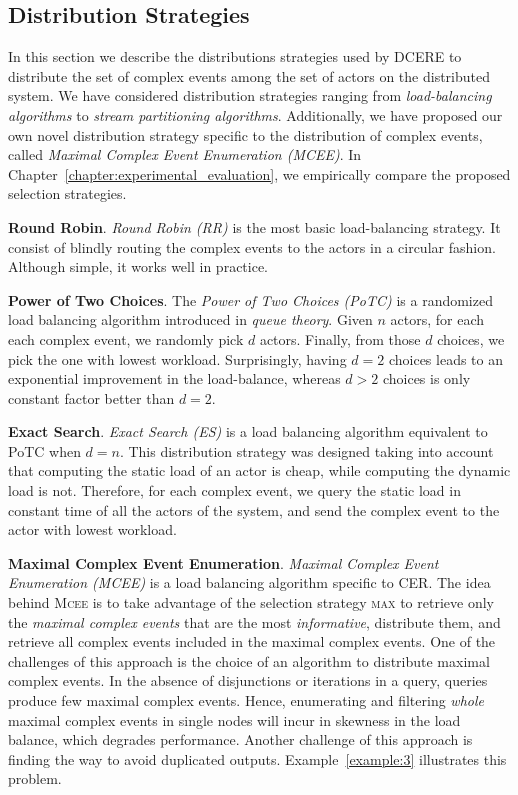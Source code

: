 \subsection{Distribution Strategies}\label{subsec:dcere:distribution-strategies}

In this section we describe the distributions strategies used by DCERE to distribute the set of complex events among the set of actors on the distributed system. We have considered distribution strategies ranging from \emph{load-balancing algorithms} to \emph{stream partitioning algorithms}. Additionally, we have proposed our own novel distribution strategy specific to the distribution of complex events, called \emph{Maximal Complex Event Enumeration (MCEE)}. In Chapter~\ref{chapter:experimental_evaluation}, we empirically compare the proposed selection strategies.

\textbf{Round Robin}. \emph{Round Robin (RR)} is the most basic load-balancing strategy. It consist of blindly routing the complex events to the actors in a circular fashion. Although simple, it works well in practice.

\textbf{Power of Two Choices}. The \emph{Power of Two Choices (PoTC)} \cite{load-balancing-1} is a randomized load balancing algorithm introduced in \emph{queue theory}. Given $n$ actors, for each each complex event, we randomly pick $d$ actors. Finally, from those $d$ choices, we pick the one with lowest workload. Surprisingly, having $d = 2$ choices leads to an exponential improvement in the load-balance, whereas $d > 2$ choices is only constant factor better than $d = 2$.

\textbf{Exact Search}. \emph{Exact Search (ES)} is a load balancing algorithm equivalent to PoTC when $d = n$. This distribution strategy was designed taking into account that computing the static load of an actor is cheap, while computing the dynamic load is not. Therefore, for each complex event, we query the static load in constant time of all the actors of the system, and send the complex event to the actor with lowest workload.

\textbf{Maximal Complex Event Enumeration}. \emph{Maximal Complex Event Enumeration (MCEE)} is a load balancing algorithm specific to CER. The idea behind \textsc{Mcee} is to take advantage of the selection strategy \textsc{max} to retrieve only the \emph{maximal complex events} that are the most \emph{informative}, distribute them, and retrieve all complex events included in the maximal complex events. One of the challenges of this approach is the choice of an algorithm to distribute maximal complex events. In the absence of disjunctions or iterations in a query, queries produce few maximal complex events. Hence, enumerating and filtering \emph{whole} maximal complex events in single nodes will incur in skewness in the load balance, which degrades performance. Another challenge of this approach is finding the way to avoid duplicated outputs. Example~\ref{example:3} illustrates this problem.

